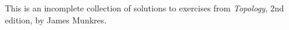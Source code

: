 This is an incomplete collection of solutions to exercises from \textit{Topology}, 2nd edition, by James Munkres. 
